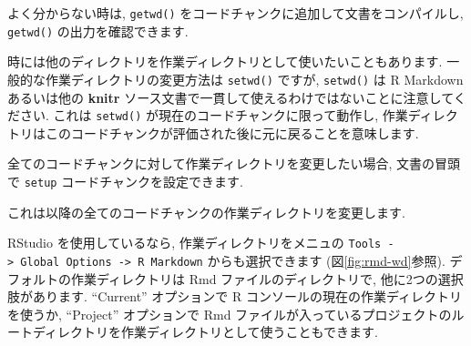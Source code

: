 \documentclass[
  11pt,
  lualatex,
  ja=standard]{bxjsreport}
\newenvironment{Shaded}{\begin{snugshade}}{\end{snugshade}}
\newcommand{\InformationTok}[1]{\textcolor[rgb]{0.56,0.35,0.01}{\textbf{\textit{#1}}}}
\begin{document}
よく分からない時は, \texttt{getwd()} をコードチャンクに追加して文書をコンパイルし, \texttt{getwd()} の出力を確認できます.

時には他のディレクトリを作業ディレクトリとして使いたいこともあります. 一般的な作業ディレクトリの変更方法は \texttt{setwd()} ですが, \texttt{setwd()} は R Markdown あるいは他の \textbf{knitr} ソース文書で一貫して使えるわけではないことに注意してください. これは \texttt{setwd()} が現在のコードチャンクに限って動作し, 作業ディレクトリはこのコードチャンクが評価された後に元に戻ることを意味します.

全てのコードチャンクに対して作業ディレクトリを変更したい場合, 文書の冒頭で \texttt{setup} コードチャンクを設定できます.

\begin{Shaded}
\end{Shaded}

これは以降の全てのコードチャンクの作業ディレクトリを変更します.

RStudio を使用しているなら, 作業ディレクトリをメニュの \texttt{Tools -\textgreater{}\ Global\ Options\ -\textgreater{}\ R\ Markdown} からも選択できます (図\ref{fig:rmd-wd}参照). デフォルトの作業ディレクトリは Rmd ファイルのディレクトリで, 他に2つの選択肢があります. ``Current'' オプションで R コンソールの現在の作業ディレクトリを使うか, ``Project'' オプションで Rmd ファイルが入っているプロジェクトのルートディレクトリを作業ディレクトリとして使うこともできます.
\end{document}
